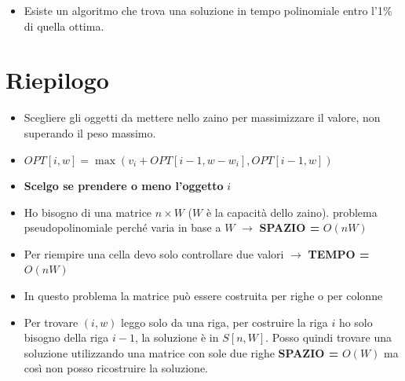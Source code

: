 \begin{itemize}
  \item Esiste un algoritmo che trova una soluzione in tempo polinomiale entro
        l'1\% di quella ottima.
\end{itemize}

\section{Riepilogo}

\begin{itemize}
  \item Scegliere gli oggetti da mettere nello zaino per massimizzare il
        valore, non superando il peso massimo.
  \item $OPT[i,w] = \max(v_i + OPT[i-1, w-w_i], OPT[i-1,w])$
  \item \textbf{Scelgo se prendere o meno l'oggetto} $i$
  \item Ho bisogno di una matrice $n \times W$ ($W$ è la capacità dello
        zaino). problema pseudopolinomiale perché varia in base a $W$
        $\rightarrow$ \textbf{SPAZIO =} $O(nW)$
  \item Per riempire una cella devo solo controllare due valori
        $\rightarrow$ \textbf{TEMPO =} $O(nW)$
  \item In questo problema la matrice può essere costruita per righe o per
        colonne
  \item Per trovare $(i,w)$ leggo solo da una riga, per costruire la riga
        $i$ ho solo bisogno della riga $i-1$, la soluzione è in
        $S[n,W]$. Posso quindi trovare una soluzione utilizzando una matrice
        con sole due righe \textbf{SPAZIO =} $O(W)$ ma così non posso
        ricostruire la soluzione.
\end{itemize}

